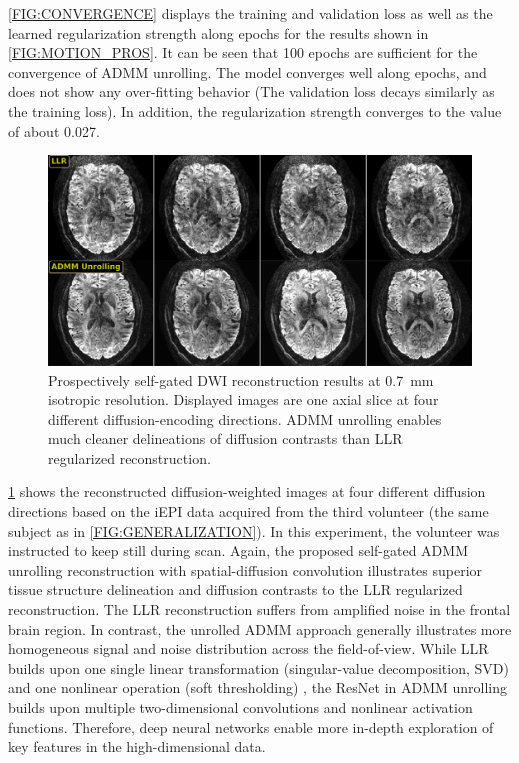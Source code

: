\documentclass[journal,twoside,web]{ieeecolor}
\begin{document}
	\cref{FIG:CONVERGENCE} displays the training and validation loss
	as well as the learned regularization strength along epochs 
	for the results shown in \cref{FIG:MOTION_PROS}.
	It can be seen that 100 epochs are sufficient for
	the convergence of ADMM unrolling. 
	The model converges well along epochs, 
	and does not show any over-fitting behavior 
	(The validation loss decays similarly as the training loss).
	In addition, the regularization strength converges
	to the value of about 0.027.

	\begin{figure}
		\includegraphics[width=\textwidth]{../figures/fig7.png}
		\caption{Prospectively self-gated DWI reconstruction results
			at 0.7~mm isotropic resolution. Displayed images are
			one axial slice at four different diffusion-encoding directions.
			ADMM unrolling enables much cleaner delineations of diffusion contrasts
			than LLR regularized reconstruction.}
		\label{FIG:SG_ZSSSL_VOL3}
	\end{figure}

	\cref{FIG:SG_ZSSSL_VOL3} shows the reconstructed diffusion-weighted images
	at four different diffusion directions based on the iEPI data
	acquired from the third volunteer 
	(the same subject as in \cref{FIG:GENERALIZATION}).
	In this experiment, the volunteer was instructed
	to keep still during scan.
	Again, the proposed self-gated ADMM unrolling reconstruction
	with spatial-diffusion convolution illustrates
	superior tissue structure delineation and 
	diffusion contrasts
	to the LLR regularized reconstruction. 
	The LLR reconstruction suffers from 
	amplified noise in the frontal brain region.
	In contrast, the unrolled ADMM approach generally illustrates 
	more homogeneous signal and noise distribution 
	across the field-of-view. 
	While LLR builds upon one single linear transformation 
	(singular-value decomposition, SVD) and 
	one nonlinear operation (soft thresholding) \cite{cai_2010_svt}, 
	the ResNet in ADMM unrolling builds upon 
	multiple two-dimensional convolutions and nonlinear activation functions. 
	Therefore, deep neural networks enable more in-depth exploration 
	of key features in the high-dimensional data.
\end{document}

